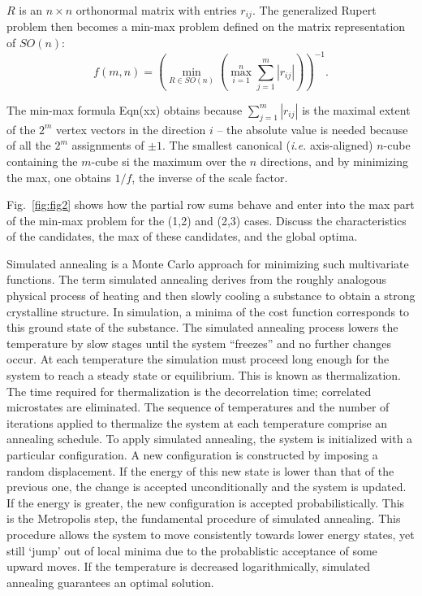 \documentclass[superscriptaddress,reprint,amsmath,amssymb,aps]{revtex4-1}
\begin{document}
$R$ is an $n \times n$ orthonormal matrix with entries $r_{ij}$. The generalized
Rupert problem then becomes a min-max problem defined on the matrix representation of $SO(n)$:
\begin{equation*}
f(m,n) = \left(
           \min_{R \in SO(n)} \left(
             \max_{i=1}^{n} \sum_{j=1}^{m} |r_{ij}|
           \right)
         \right)^{-1} .
\end{equation*}

The min-max formula Eqn(xx) obtains because $\sum_{j=1}^{m} |r_{ij}|$ is the maximal extent of the $2^m$ vertex vectors in the direction $i$ -- the absolute value is needed because of all the $2^m$ assignments of $\pm 1$. 
The smallest canonical ({\it i.e.} axis-aligned) $n$-cube containing the $m$-cube si the maximum over the $n$ directions, and by minimizing the max, one obtains $1/f$, the inverse of the scale factor.

Fig.~\ref{fig:fig2} shows how the partial row sums behave and enter into
the max part of the min-max problem for the (1,2) and (2,3) cases.  Discuss
the characteristics of the candidates, the max of these candidates, and the
global optima.


\vspace{.15in}

Simulated annealing is a Monte Carlo approach for minimizing such
multivariate functions. The term simulated annealing derives from the
roughly analogous physical process of heating and then slowly cooling a
substance to obtain a strong crystalline structure. In simulation, a minima
of the cost function corresponds to this ground state of the substance. The
simulated annealing process lowers the temperature by slow stages until the
system ``freezes'' and no further changes occur. At each temperature the
simulation must proceed long enough for the system to reach a steady state
or equilibrium. This is known as thermalization. The time required for
thermalization is the decorrelation time; correlated microstates are
eliminated. The sequence of temperatures and the number of iterations
applied to thermalize the system at each temperature comprise an annealing
schedule.  To apply simulated annealing, the system is initialized with a
particular configuration. A new configuration is constructed by imposing a
random displacement. If the energy of this new state is lower than that of
the previous one, the change is accepted unconditionally and the system is
updated. If the energy is greater, the new configuration is accepted
probabilistically. This is the Metropolis step, the fundamental procedure
of simulated annealing. This procedure allows the system to move
consistently towards lower energy states, yet still ‘jump’ out of local
minima due to the probablistic acceptance of some upward moves. If the
temperature is decreased logarithmically, simulated annealing guarantees an
optimal solution.
\end{document}
